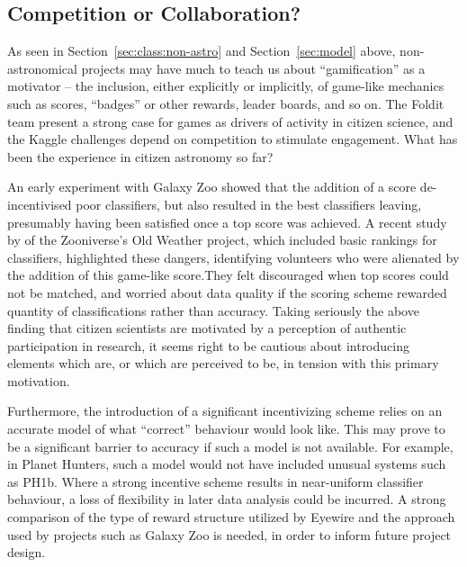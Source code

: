 \documentclass{ar2e}
\def\Sref#1{Section~\ref{#1}\xspace}
\begin{document}

\subsection{Competition or Collaboration?}
\label{sec:crowd:gamification}

As seen in \Sref{sec:class:non-astro} and \Sref{sec:model}  above,
non-astronomical projects may have much to teach us about ``gamification'' as a
motivator -- the inclusion, either explicitly or implicitly, of game-like
mechanics such as scores, ``badges'' or other rewards, leader boards, and so on.
The Foldit team present a strong case for games as drivers of activity in
citizen science, and the Kaggle challenges depend on competition to stimulate
engagement. What has been the experience in citizen astronomy so far?

An early experiment with Galaxy Zoo showed that the addition of a score
de-incentivised poor classifiers, but also resulted in the best classifiers
leaving, presumably having been satisfied once a top score was achieved. A
recent study by \citep{Eveleigh++2013} of the Zooniverse's Old Weather
project, which included basic rankings for classifiers, highlighted these
dangers, identifying volunteers who were alienated by the addition of this
game-like score.They felt discouraged when top scores could not be matched, and
worried about data quality if the scoring scheme rewarded quantity of
classifications rather than accuracy. Taking seriously the above finding  that
citizen scientists are motivated by a perception of authentic participation in
research, it seems right to be cautious about introducing elements which are, or
which are perceived to be, in tension with this primary motivation. 

Furthermore, the introduction of a significant incentivizing scheme relies on an
accurate model of what ``correct'' behaviour would look like. This may prove to
be a significant barrier to accuracy if such a model is not available. For
example, in Planet Hunters, such a model would not have included unusual systems
such as PH1b. Where a strong incentive scheme results in near-uniform classifier
behaviour, a loss of flexibility in later data analysis could be incurred.  A
strong comparison of the type of reward structure utilized by Eyewire and the
approach used by projects such as Galaxy Zoo is needed, in order to inform
future project design. 
\end{document}
